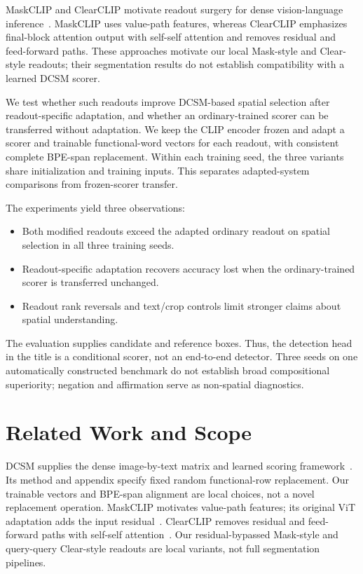 \documentclass[10pt,twocolumn,letterpaper]{article}
\begin{document}
MaskCLIP and ClearCLIP motivate readout surgery for dense vision-language inference~\citep{zhou2021maskclip,lan2024clearclip}. MaskCLIP uses value-path features, whereas ClearCLIP emphasizes final-block attention output with self-self attention and removes residual and feed-forward paths. These approaches motivate our local Mask-style and Clear-style readouts; their segmentation results do not establish compatibility with a learned DCSM scorer.

We test whether such readouts improve DCSM-based spatial selection after readout-specific adaptation, and whether an ordinary-trained scorer can be transferred without adaptation. We keep the CLIP encoder frozen and adapt a scorer and trainable functional-word vectors for each readout, with consistent complete BPE-span replacement. Within each training seed, the three variants share initialization and training inputs. This separates adapted-system comparisons from frozen-scorer transfer.

The experiments yield three observations:
\begin{itemize}
\item Both modified readouts exceed the adapted ordinary readout on spatial selection in all three training seeds.
\item Readout-specific adaptation recovers accuracy lost when the ordinary-trained scorer is transferred unchanged.
\item Readout rank reversals and text/crop controls limit stronger claims about spatial understanding.
\end{itemize}

The evaluation supplies candidate and reference boxes. Thus, the detection head in the title is a conditional scorer, not an end-to-end detector. Three seeds on one automatically constructed benchmark do not establish broad compositional superiority; negation and affirmation serve as non-spatial diagnostics.

\section{Related Work and Scope}
DCSM supplies the dense image-by-text matrix and learned scoring framework~\citep{kang2025dcsm}. Its method and appendix specify fixed random functional-row replacement. Our trainable vectors and BPE-span alignment are local choices, not a novel replacement operation. MaskCLIP motivates value-path features; its original ViT adaptation adds the input residual~\citep{zhou2021maskclip}. ClearCLIP removes residual and feed-forward paths with self-self attention~\citep{lan2024clearclip}. Our residual-bypassed Mask-style and query-query Clear-style readouts are local variants, not full segmentation pipelines.
\end{document}
